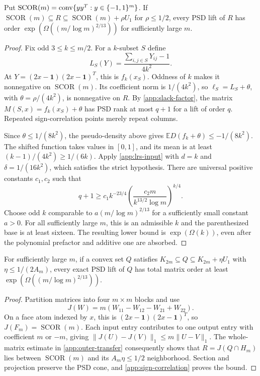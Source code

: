 \begin{lemma}\label{app:sign-correlation}
Put $\operatorname{SCOR}(m)=\operatorname{conv}\{yy^T:y\in\{-1,1\}^m\}$.
If $\operatorname{SCOR}(m)\subseteq R\subseteq
\operatorname{SCOR}(m)+\rho U_1$ for $\rho\le1/2$, every PSD lift
of $R$ has order $\exp(\Omega((m/\log m)^{2/13}))$ for sufficiently
large $m$.
\end{lemma}
\begin{proof}
Fix odd $3\le k\le m/2$. For a $k$-subset $S$ define
\[
 L_S(Y)=\frac{\sum_{i,j\in S}Y_{ij}-1}{4k^2}.
\]
At $Y=(2x-\mathbf1)(2x-\mathbf1)^T$, this is $f_k(x_S)$.
Oddness of $k$ makes it nonnegative on $\operatorname{SCOR}(m)$.
Its coefficient norm is $1/(4k^2)$, so
$\ell_S=L_S+\theta$, with $\theta=\rho/(4k^2)$, is nonnegative on
$R$. By \cref{app:slack-factor}, the matrix
$M(S,x)=f_k(x_S)+\theta$ has PSD rank at most $q+1$ for a lift of
order $q$. Repeated sign-correlation points merely repeat columns.

Since $\theta\le1/(8k^2)$, the pseudo-density above gives
$\mathbb ED(f_k+\theta)\le-1/(8k^2)$.
The shifted function takes values in $[0,1]$, and its mean is at least
$(k-1)/(4k^2)\ge1/(6k)$. Apply \eqref{app:lrs-input} with
$d=k$ and $\delta=1/(16k^2)$, which satisfies the strict hypothesis.
There are universal positive constants $c_1,c_2$ such that
\[
 q+1\ge c_1k^{-23/4}
 \left(\frac{c_2m}{k^{13/2}\log m}\right)^{k/4}.
\]
Choose odd $k$ comparable to $a(m/\log m)^{2/13}$ for a sufficiently
small constant $a>0$. For all sufficiently large $m$, this is an
admissible $k$ and the parenthesized base is at least sixteen.
The resulting lower bound is $\exp(\Omega(k))$, even after the
polynomial prefactor and additive one are absorbed.
\end{proof}

\begin{theorem}\label{app:approx-sdp}
For sufficiently large $m$, if a convex set $Q$ satisfies
$K_{2m}\subseteq Q\subseteq K_{2m}+\eta U_1$ with
$\eta\le1/(2A_m)$, every exact PSD lift of $Q$ has total matrix
order at least $\exp(\Omega((m/\log m)^{2/13}))$.
\end{theorem}
\begin{proof}
Partition matrices into four $m\times m$ blocks and use
\[
 J(W)=m(W_{11}-W_{12}-W_{21}+W_{22}).
\]
On a face atom indexed by $x$, this is
$(2x-\mathbf1)(2x-\mathbf1)^T$, so $J(F_m)=\operatorname{SCOR}(m)$.
Each input entry contributes to one output entry with coefficient
$m$ or $-m$, giving $\|J(U)-J(V)\|_1\le m\|U-V\|_1$.
The whole-matrix estimate in \cref{app:outer-transfer} consequently
shows that $R=J(Q\cap H_m)$ lies between $\operatorname{SCOR}(m)$
and its $A_m\eta\le1/2$ neighborhood. Section and projection preserve
the PSD cone, and \cref{app:sign-correlation} proves the bound.
\end{proof}

